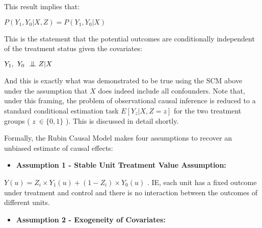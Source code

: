 \documentclass[../main.tex]{subfiles}
\begin{document}
\vspace{\baselineskip}
This result implies that:\par


\vspace{\baselineskip}
 \( P \left( Y_{1}, Y_{0}  \vert  X, Z  \right) =P \left( Y_{1}, Y_{0} \vert  X \right)\) \par


\vspace{\baselineskip}
This is the statement that the potential outcomes are conditionally independent of the treatment status given the covariates:\par

 \( Y_{1},~Y_{0} ~ \bigCI Z  \vert  X \) \par

And this is exactly what was demonstrated to be true using the SCM above under the assumption that  \( X \) does indeed include all confounders. Note that, under this framing, the problem of observational causal inference is reduced to a standard conditional estimation task  \( E \left[ Y_{z}  \vert  X, Z=z \right]  \) for the two treatment groups ( \( z~ \in  \{ 0, 1 \}  \) ). This is discussed in detail shortly.\par


\vspace{\baselineskip}
Formally, the Rubin Causal Model makes four assumptions to recover an unbiased estimate of causal effects:\par


\vspace{\baselineskip}
\begin{itemize}
    \item \textbf{Assumption 1 - Stable Unit Treatment Value Assumption:}
\end{itemize}\par

\begin{adjustwidth}{0.5in}{0.0in}
 \( Y \left( u \right)  =Z_{i} \times Y_{1} \left( u \right) + \left( 1-Z_{i} \right)  \times Y_{0} \left( u \right)  \) . IE, each unit has a fixed outcome under treatment and control and there is no interaction between the outcomes of different units.\par

\end{adjustwidth}


\vspace{\baselineskip}
\begin{itemize}
    \item \textbf{Assumption 2 - Exogeneity of Covariates:}
\end{itemize}\par
\end{document}
